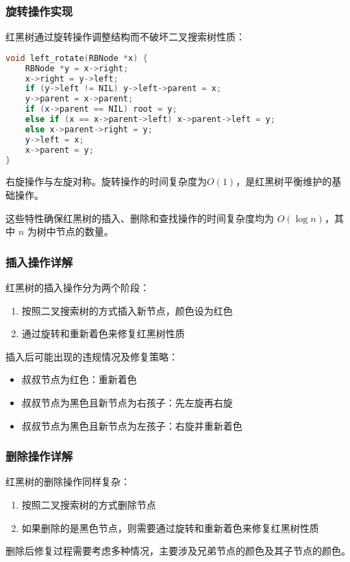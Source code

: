\documentclass[12pt,a4paper]{article}
\begin{document}
\subsubsection{旋转操作实现}
红黑树通过旋转操作调整结构而不破坏二叉搜索树性质：

\begin{lstlisting}[language=C,caption=左旋操作实现]
void left_rotate(RBNode *x) {
    RBNode *y = x->right;
    x->right = y->left;
    if (y->left != NIL) y->left->parent = x;
    y->parent = x->parent;
    if (x->parent == NIL) root = y;
    else if (x == x->parent->left) x->parent->left = y;
    else x->parent->right = y;
    y->left = x;
    x->parent = y;
}
\end{lstlisting}

右旋操作与左旋对称。旋转操作的时间复杂度为$O(1)$，是红黑树平衡维护的基础操作。

这些特性确保红黑树的插入、删除和查找操作的时间复杂度均为 \(O(\log n)\)，其中 \(n\) 为树中节点的数量。

\subsubsection{插入操作详解}
红黑树的插入操作分为两个阶段：
\begin{enumerate}
\item 按照二叉搜索树的方式插入新节点，颜色设为红色
\item 通过旋转和重新着色来修复红黑树性质
\end{enumerate}

插入后可能出现的违规情况及修复策略：
\begin{itemize}
\item 叔叔节点为红色：重新着色
\item 叔叔节点为黑色且新节点为右孩子：先左旋再右旋
\item 叔叔节点为黑色且新节点为左孩子：右旋并重新着色
\end{itemize}

\subsubsection{删除操作详解}
红黑树的删除操作同样复杂：
\begin{enumerate}
\item 按照二叉搜索树的方式删除节点
\item 如果删除的是黑色节点，则需要通过旋转和重新着色来修复红黑树性质
\end{enumerate}

删除后修复过程需要考虑多种情况，主要涉及兄弟节点的颜色及其子节点的颜色。
\end{document}
